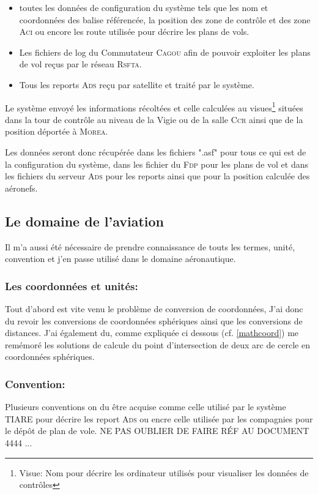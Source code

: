 \begin{itemize}
    \item toutes les données de configuration du système tels que les nom et coordonnées des balise référencée, la position des zone de contrôle et des zone \textsc{Aci} ou encore les route utilisée pour décrire les plans de vols.
    \item Les fichiers de log du Commutateur \textsc{Cagou} afin de pouvoir exploiter les plans de vol reçus par le réseau \textsc{Rsfta}.
    \item Tous les reports \textsc{Ads} reçu par satellite et traité par le système.
\end{itemize}\medskip 
Le système envoyé les informations récoltées et celle calculées au visues\footnote{Visue: Nom pour décrire les ordinateur utilisés pour visualiser les données de contrôles} situées dans la tour de contrôle au niveau de la Vigie ou de la salle \textsc{Ccr} ainsi que de la position déportée à \textsc{Morea}.

Les données seront donc récupérée dans les fichiers ".asf" pour tous ce qui est de la configuration du système, dans les fichier du \textsc{Fdp} pour les plans de vol et dans les fichiers du serveur \textsc{Ads} pour les reports ainsi que pour la position calculée des aéronefs.

    \subsection{Le domaine de l'aviation}
Il m'a aussi été nécessaire de prendre connaissance de touts les termes, unité, convention et j'en passe utilisé dans le domaine aéronautique.

        \subsubsection{Les coordonnées et unités:}
Tout d'abord est vite venu le problème de conversion de coordonnées, J'ai donc du revoir les conversions de coordonnées sphériques ainsi que les conversions de distances.
J'ai également du, comme expliquée ci dessous (cf. \vref{mathcoord})
me remémoré les solutions de calcule du point d'intersection de deux arc de cercle en coordonnées sphériques.

        \subsubsection{Convention:}
Plusieurs conventions on du être acquise comme celle utilisé par le système TIARE pour décrire les report \textsc{Ads} ou encre celle utilisée par les compagnies pour le dépôt de plan de vole.
NE PAS OUBLIER DE FAIRE RÉF AU DOCUMENT 4444 ...





